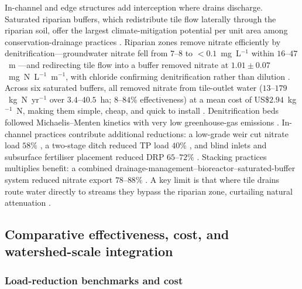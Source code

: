 \documentclass[11pt]{article}
\begin{document}
In-channel and edge structures add interception where drains discharge.
Saturated riparian buffers, which redistribute tile flow laterally through
the riparian soil, offer the largest climate-mitigation potential per unit
area among conservation-drainage practices \parencite{Hall2025}. Riparian
zones remove nitrate efficiently by denitrification---groundwater nitrate fell
from $7$--$8$ to $<0.1$~mg~L$^{-1}$ within $16$--$47$~m
\parencite{JACOBS1985,Schilling2022}---and redirecting tile flow into a buffer
removed nitrate at $1.01\pm0.07$~mg~N~L$^{-1}$~m$^{-1}$, with chloride
confirming denitrification rather than dilution
\parencite{Jaynes2014,Carstensen2021}. Across six saturated buffers, all
removed nitrate from tile-outlet water ($13$--$179$~kg~N~yr$^{-1}$ over
$3.4$--$40.5$~ha; $8$--$84\%$ effectiveness) at a mean cost of
US\$$2.94$~kg$^{-1}$~N, making them simple, cheap, and quick to install
\parencite{Jaynes2019}. Denitrification beds followed Michaelis--Menten
kinetics with very low greenhouse-gas emissions \parencite{Ghane2015}.
In-channel practices contribute additional reductions: a low-grade weir cut
nitrate load $58\%$ \parencite{Strock2025b}, a two-stage ditch reduced TP load
$40\%$ \parencite{Hodaj2017}, and blind inlets and subsurface fertiliser
placement reduced DRP $65$--$72\%$
\parencite{Kröger2013,Wilson2019,Sharpley2019}. Stacking practices multiplies
benefit: a combined drainage-management--bioreactor--saturated-buffer system
reduced nitrate export $78$--$88\%$ \parencite{Singh2024b}. A key limit is
that where tile drains route water directly to streams they bypass the
riparian zone, curtailing natural attenuation \parencite{Puckett2005}.

\subsection{Comparative effectiveness, cost, and watershed-scale integration}

\subsubsection{Load-reduction benchmarks and cost}
\end{document}
